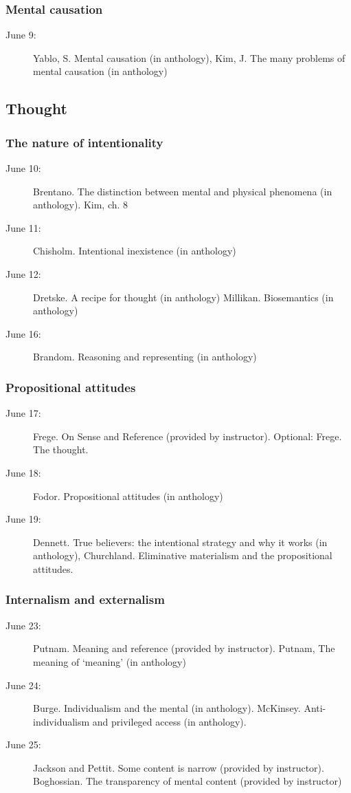 \documentclass[11pt]{article}
\begin{document}
\subsubsection{Mental causation}
\begin{description}
\item [June 9:] Yablo, S. Mental causation (in anthology), Kim, J. The many problems of mental causation (in anthology)
\end{description}

\subsection{Thought}
\subsubsection{The nature of intentionality}
\begin{description}
\item [June 10:] Brentano. The distinction between mental and physical phenomena (in anthology). Kim, ch. 8
\item [June 11:] Chisholm. Intentional inexistence (in anthology)
\item [June 12:] Dretske. A recipe for thought (in anthology) Millikan. Biosemantics (in anthology)
\item [June 16:] Brandom. Reasoning and representing (in anthology)
\end{description}

\subsubsection{Propositional attitudes}
\begin{description}
\item [June 17:] Frege. On Sense and Reference (provided by instructor). Optional: Frege. The thought.
\item [June 18:] Fodor. Propositional attitudes (in anthology)
\item [June 19:] Dennett. True believers: the intentional strategy and why it works (in anthology), Churchland. Eliminative materialism and the propositional attitudes.
\end{description}

\subsubsection{Internalism and externalism}
\begin{description}
\item [June 23:] Putnam. Meaning and reference (provided by instructor). Putnam, The meaning of `meaning' (in anthology)
\item [June 24:] Burge. Individualism and the mental (in anthology). McKinsey. Anti-individualism and privileged access (in anthology).
\item [June 25:] Jackson and Pettit. Some content is narrow (provided by instructor). Boghossian. The transparency of mental content (provided by instructor)
\end{description}
\end{document}
